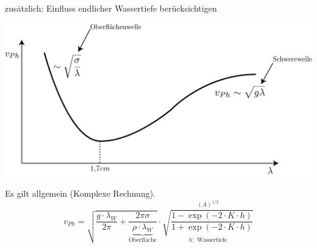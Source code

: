 zusätzlich: Einfluss endlicher Wassertiefe berücksichtigen
\begin{center}
	\includegraphics[width=0.7\linewidth]{skizzen/19/19B27}
\end{center}
Es gilt allgemein (Komplexe Rechnung).\\
$$ v_{Ph} = \sqrt{\frac{g\cdot\lambda_W}{2\pi}+\frac{2\pi\sigma}{\underbrace{\rho\cdot\lambda_W}_{\text{Oberfläche}}}} \cdot \overset{(A)^{1/2}}{\underset{h: \text{ Wassertiefe}}{\sqrt{\frac{1-\exp(-2\cdot K \cdot h)}{1+\exp(-2 \cdot K \cdot h)}}}}$$

